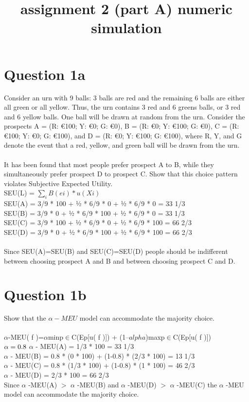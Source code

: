 \documentclass[12pt]{article}
\begin{document}
\title{assignment 2 (part A) numeric simulation}
\maketitle

\section*{Question 1a}
Consider an urn with 9 balls: 3 balls are red and the remaining 6 balls are either all green or all yellow. Thus, the urn contains 3 red and 6 greens balls, or 3 red and 6 yellow balls. One ball will be drawn at random from the urn. Consider the prospects A = (R: €100; Y: €0; G: €0), B = (R: €0; Y: €100; G: €0), C = (R: €100; Y: €0; G: €100), and D = (R: €0; Y: €100; G: €100), where R, Y, and G denote the event that a red, yellow, and green ball will be drawn from the urn. \\\\
It has been found that most people prefer prospect A to B, while they simultaneously prefer prospect D to prospect C. Show that this choice pattern violates Subjective Expected Utility. \\ SEU(L) = $\sum_{i}B(ei)*u(Xi)$\\
SEU(A) = 3/9 * 100 + ½ * 6/9 * 0 + ½ * 6/9 * 0 = 33 1/3 \\
SEU(B) = 3/9 * 0 + ½ * 6/9 * 100 + ½ * 6/9 * 0 = 33 1/3 \\
SEU(C) = 3/9 * 100 + ½ * 6/9 * 0 + ½ * 6/9 * 100 = 66 2/3\\
SEU(D) = 3/9 * 0 + ½ * 6/9 * 100 + ½ * 6/9 * 100 = 66 2/3\\\\
Since SEU(A)=SEU(B) and SEU(C)=SEU(D) people should be indifferent between choosing prospect A and B and between choosing prospect C and D. 




\section*{Question 1b}
Show that the $ \alpha-MEU $ model can accommodate the majority choice.\\\\ $\alpha$-MEU( f )=$\alpha$minp$\in$C(Ep[u( f )]) + (1–$alpha$)maxp$\in$C(Ep[u( f )])\\
$\alpha= 0.8\\$
$\alpha$ - MEU(A) = 1/3 * 100 = 33 1/3\\
$\alpha$ - MEU(B) = 0.8 * (0 * 100) +  (1-0.8) * (2/3 * 100) = 13 1/3\\  
$\alpha$ -  MEU(C) = 0.8 * (1/3 * 100) + (1-0.8) * (1 * 100) = 46 2/3\\ 
$\alpha$ -  MEU(D) = 2/3 * 100 = 66 2/3\\ 
Since $ \alpha$ -MEU(A) $>$ $\alpha$ -MEU(B) and $\alpha$ -MEU(D) $>$ $\alpha$ -MEU(C) the $\alpha$ -MEU model can accommodate the majority choice. 
\end{document}
